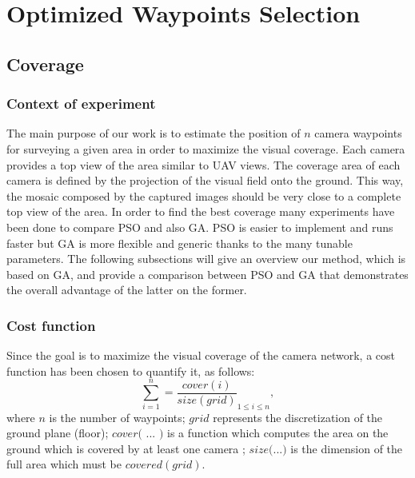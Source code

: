 \chapter{Optimized Waypoints Selection} \label{chap:optimizedway}


\section{Coverage}

\subsection {Context of experiment}

The main purpose of our work is to estimate the position of $n$ camera waypoints for surveying a given area in order to maximize the visual coverage. Each camera provides a top view of the area similar to UAV views. The coverage area of each camera is defined by the projection of the visual field onto the ground. This way, the mosaic composed by the captured images should be very close to a complete top view of the area. 
In order to find the best coverage many experiments have been done to compare PSO and also GA. PSO is easier to implement and runs faster but GA is more flexible and generic thanks to the many tunable parameters. 
The following subsections will give an  overview our method, which is based on GA, and provide a comparison between PSO and GA that demonstrates the overall advantage of the latter on the former.

\subsection{ Cost function }

Since the goal is to maximize the visual coverage of the camera network, a cost function has been chosen to quantify it, as follows: 
\begin{equation}
 \sum_{i=1}^n = \frac{cover(i)}{size(grid)} _{1\leq i\leq n}  ,
\end{equation}
where $n$ is the number of waypoints; 
$grid$ represents the discretization of the ground plane (floor);
$cover($ ... $)$ is a function which computes the area on the ground which is covered by at least one camera ;
$size($...$)$ is the dimension of the full area which must be $covered (grid)$. 



